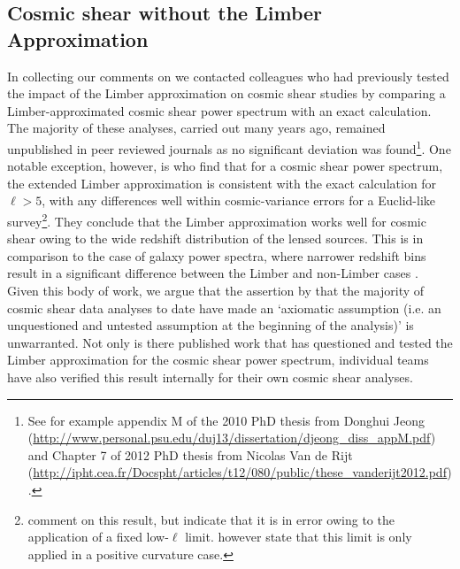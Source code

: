  \subsection{Cosmic shear without the Limber Approximation}
In collecting our comments on \citet{kitching/etal:2016} we contacted colleagues who had previously tested the impact of the Limber approximation on cosmic shear studies by comparing a Limber-approximated cosmic shear power spectrum with an exact calculation.  The majority of these analyses, carried out many years ago, remained unpublished in peer reviewed journals as no significant deviation was found\footnote{See for example appendix M of the 2010 PhD thesis from Donghui Jeong (\url{http://www.personal.psu.edu/duj13/dissertation/djeong_diss_appM.pdf}) and Chapter 7 of 2012 PhD thesis from Nicolas Van de Rijt (\url{http://ipht.cea.fr/Docspht/articles/t12/080/public/these_vanderijt2012.pdf}).}.  One notable exception, however, is \citet{giannantonio/etal:2012} who find that for a cosmic shear power spectrum, the extended Limber approximation is consistent with the exact calculation for $\ell>5$, with any differences well within cosmic-variance errors for a Euclid-like survey\footnote{\citet{kitching/etal:2016} comment on this result, but indicate that it is in error owing to the application of a fixed low-$\ell$ limit.  \citet{giannantonio/etal:2012} however state that this limit is only applied in a positive curvature case.}.  They conclude that the Limber approximation works well for cosmic shear owing to the wide redshift distribution of the lensed sources.  This is in comparison to the case of galaxy power spectra,  where narrower redshift bins result in a significant difference between the Limber and non-Limber cases \citep[see also][]{simon/2007}.   Given this body of work, we argue that the assertion by \citet{kitching/etal:2016} that the majority of cosmic shear data analyses to date have made an `axiomatic assumption (i.e. an unquestioned and untested assumption at the beginning of the analysis)'  is unwarranted.  Not only is there published work that has questioned and tested the Limber approximation for the cosmic shear power spectrum, individual teams have also verified this result internally for their own cosmic shear analyses.    

